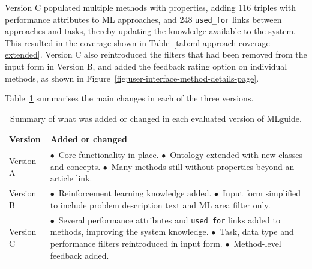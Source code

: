 Version C populated multiple methods with properties, 
adding 116 triples with performance attributes to ML
approaches, and 248 \texttt{used\_for} links between approaches and
tasks, thereby updating the knowledge available to the system. This
resulted in the coverage shown in
Table~\ref{tab:ml-approach-coverage-extended}. Version C also
reintroduced the filters that had been removed from the input form in Version B, and added the
feedback rating option on individual methods, 
as shown in Figure~\ref{fig:user-interface-method-details-page}. 

Table~\ref{tab:system-versions} summarises the main changes in each
of the three versions.

\begin{table}[H]
\centering
\caption[Differences between system versions]{Summary of what was
added or changed in each evaluated version of MLguide.}
\label{tab:system-versions}
\begin{tabularx}{\textwidth}{lX}
\toprule
\textbf{Version} & \textbf{Added or changed} \\
\midrule
Version A &
$\bullet$~Core functionality in place. \newline
$\bullet$~Ontology extended with new classes and concepts. \newline
$\bullet$~Many methods still without properties beyond an article link. \\
\addlinespace[8pt]
Version B &
$\bullet$~Reinforcement learning knowledge added. \newline
$\bullet$~Input form simplified to include problem description text and ML area filter only. \\
\addlinespace[8pt]
Version C &
$\bullet$~Several performance attributes and \texttt{used\_for} links added to methods, improving the system knowledge. \newline
$\bullet$~Task, data type and performance filters reintroduced in input form. \newline
$\bullet$~Method-level feedback added. \\
\bottomrule
\end{tabularx}
\end{table}


